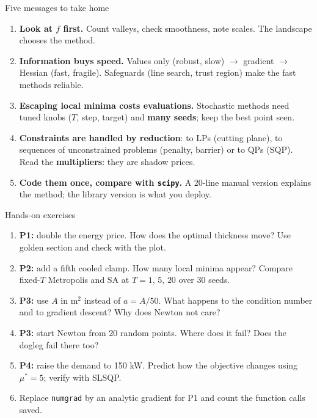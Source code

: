\begin{frame}{Five messages to take home}
  \begin{enumerate}
    \item \textbf{Look at $f$ first.} Count valleys, check smoothness, note scales. The landscape chooses the method.
    \item \textbf{Information buys speed.} Values only (robust, slow) $\to$ gradient $\to$ Hessian (fast, fragile). Safeguards (line search, trust region) make the fast methods reliable.
    \item \textbf{Escaping local minima costs evaluations.} Stochastic methods need tuned knobs ($T$, step, target) and \textbf{many seeds}; keep the best point seen.
    \item \textbf{Constraints are handled by reduction}: to LPs (cutting plane), to sequences of unconstrained problems (penalty, barrier) or to QPs (SQP). Read the \textbf{multipliers}: they are shadow prices.
    \item \textbf{Code them once, compare with \texttt{scipy}.} A 20-line manual version explains the method; the library version is what you deploy.
  \end{enumerate}
\end{frame}

\begin{frame}{Hands-on exercises}
  \small
  \begin{enumerate}
    \item \textbf{P1:} double the energy price. How does the optimal thickness move? Use golden section and check with the plot.
    \item \textbf{P2:} add a fifth cooled clamp. How many local minima appear? Compare fixed-$T$ Metropolis and SA at $T=1,\,5,\,20$ over 30 seeds.
    \item \textbf{P3:} use $A$ in m$^2$ instead of $a=A/50$. What happens to the condition number and to gradient descent? Why does Newton not care?
    \item \textbf{P3:} start Newton from 20 random points. Where does it fail? Does the dogleg fail there too?
    \item \textbf{P4:} raise the demand to 150 kW. Predict how the objective changes using $\mu^\ast=5$; verify with SLSQP.
    \item Replace \texttt{numgrad} by an analytic gradient for P1 and count the function calls saved.
  \end{enumerate}
\end{frame}


